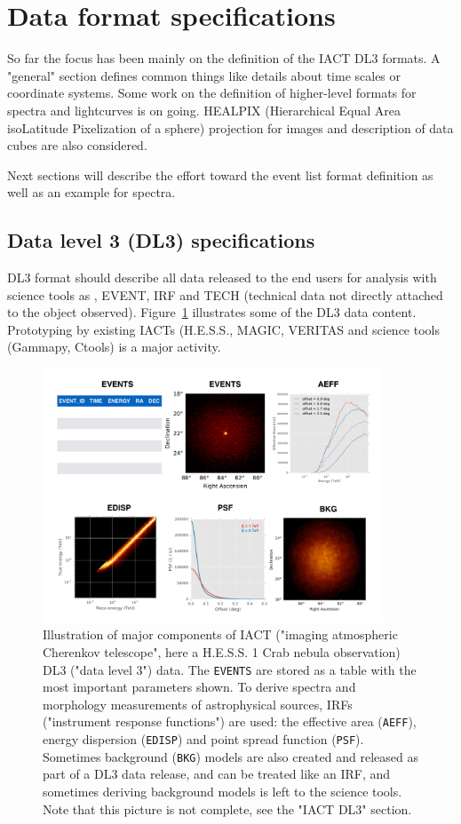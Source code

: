 \section{Data format specifications}

So far the focus has been mainly on the definition of the IACT DL3 formats.  A "general" section defines common things like details about time scales or coordinate systems. Some work on the definition of higher-level formats for spectra and lightcurves is on going. HEALPIX  (Hierarchical Equal Area isoLatitude Pixelization of a sphere) projection for images and  description of data cubes are also considered.

Next sections will describe the effort toward the event list format definition as well as an example for spectra.

\subsection{Data level 3 (DL3) specifications}

DL3 format should describe all data released to the end users for analysis with science tools as , EVENT, IRF and TECH (technical data not directly attached to the object observed). Figure~\ref{fig:iact-dl3} illustrates some of the DL3 data content. Prototyping by existing IACTs (H.E.S.S., MAGIC, VERITAS and science tools (Gammapy, Ctools) is a major activity. 

\begin{figure}[tb]
\centerline{\includegraphics[width=0.9\textwidth]{figures/iact-dl3}}
\caption{
Illustration of major components of IACT ("imaging atmospheric Cherenkov telescope", here a H.E.S.S. 1 Crab nebula observation) DL3 ("data level 3") data. The \texttt{EVENTS} are stored as a table with the most important parameters shown. To derive spectra and morphology measurements of astrophysical sources, IRFs ("instrument response functions") are used: the effective area (\texttt{AEFF}), energy dispersion (\texttt{EDISP}) and point spread function (\texttt{PSF}). Sometimes background (\texttt{BKG}) models are also created and released as part of a DL3 data release, and can be treated like an IRF, and sometimes deriving background models is left to the science tools. Note that this picture is not complete, see the "IACT DL3" section.
}
\label{fig:iact-dl3}
\end{figure}

